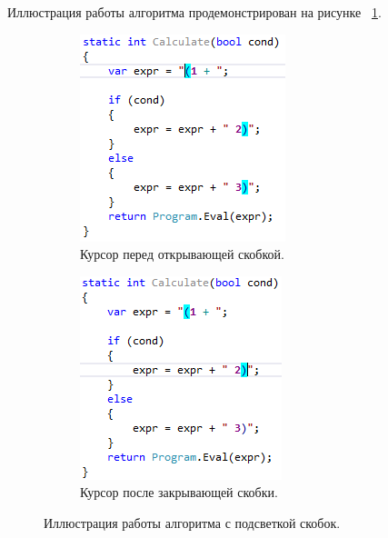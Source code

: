 Иллюстрация работы алгоритма продемонстрирован на рисунке ~\ref{ex}.

\begin{figure}[h]
    \centering
    \begin{subfigure}{0.25\textwidth}
        \includegraphics{Pictures/BracketExample.png}
        \caption*{Курсор перед открывающей скобкой.}
    \end{subfigure}
    \qquad \qquad \qquad
    \begin{subfigure}{0.25\textwidth}
        \includegraphics{Pictures/BracketExampleWithRight.png}
        \caption*{Курсор после закрывающей скобки.}
    \end{subfigure}
    \caption{Иллюстрация работы алгоритма с подсветкой скобок.}
    \label{ex}
\end{figure}